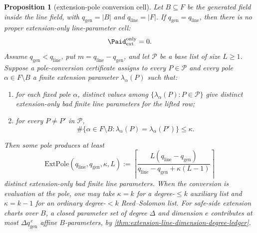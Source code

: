 \documentclass[11pt]{article}
\newtheorem{proposition}[proposition]{Proposition}
\theoremstyle{definition}
\theoremstyle{remark}
\begin{document}
\begin{proposition}[extension-pole conversion cell]\label{prop:capf-extension}
Let $B\subseteq F$ be the generated field inside the line field, with $q_{\mathrm{gen}}=|B|$ and $q_{\mathrm{line}}=|F|$.  If $q_{\mathrm{gen}}=q_{\mathrm{line}}$, then there is no proper extension-only line-parameter cell:
\[
        \Paid_{\mathrm{ext}}^{\mathrm{only}}=0.
\]
Assume $q_{\mathrm{gen}}<q_{\mathrm{line}}$, put $m=q_{\mathrm{line}}-q_{\mathrm{gen}}$, and let $\mathcal P$ be a base list of size $L\ge1$.  Suppose a pole-conversion certificate assigns to every $P\in\mathcal P$ and every pole $\alpha\in F\setminus B$ a finite extension parameter $\lambda_\alpha(P)$ such that:
\begin{enumerate}[label=\textup{(\roman*)}]
\item for each fixed pole $\alpha$, distinct values among $\{\lambda_\alpha(P):P\in\mathcal P\}$ give distinct extension-only bad finite line parameters for the lifted row;
\item for every $P\ne P'$ in $\mathcal P$,
\[
        \#\{\alpha\in F\setminus B:\lambda_\alpha(P)=\lambda_\alpha(P')\}\le \kappa .
\]
\end{enumerate}
Then some pole produces at least
\[
        \mathrm{ExtPole}(q_{\mathrm{line}},q_{\mathrm{gen}},\kappa,L)
        :=
        \left\lceil
        \frac{L(q_{\mathrm{line}}-q_{\mathrm{gen}})}
        {q_{\mathrm{line}}-q_{\mathrm{gen}}+\kappa(L-1)}
        \right\rceil
\]
distinct extension-only bad finite line parameters.  When the conversion is evaluation at the pole, one may take $\kappa=k$ for a degree-$\le k$ auxiliary list and $\kappa=k-1$ for an ordinary degree-$<k$ Reed--Solomon list.  For safe-side extension charts over $B$, a closed parameter set of degree $\Delta$ and dimension $e$ contributes at most $\Delta q_{\mathrm{gen}}^{\,e}$ affine $B$-parameters, by \cref{thm:extension-line-dimension-degree-ledger}.
\end{proposition}
\end{document}
